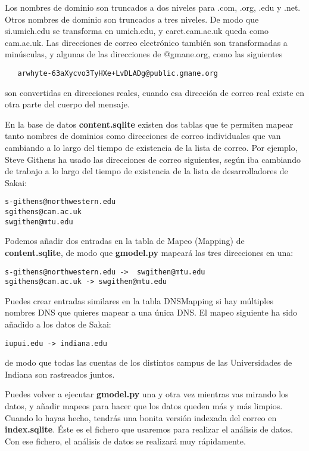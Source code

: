 Los nombres de dominio son truncados a dos niveles para .com, .org, .edu y .net.
Otros nombres de dominio son truncados a tres niveles. De modo que si.umich.edu se transforma en
umich.edu, y caret.cam.ac.uk queda como cam.ac.uk. Las direcciones de correo electrónico también
son transformadas a minúsculas, y algunas de las direcciones de @gmane.org, como las siguientes

\beforeverb
\begin{verbatim}
   arwhyte-63aXycvo3TyHXe+LvDLADg@public.gmane.org
\end{verbatim}
\afterverb
%
son convertidas en direcciones reales, cuando esa dirección de correo real existe
en otra parte del cuerpo del mensaje.

En la base de datos {\bf content.sqlite} existen dos tablas que te permiten
mapear tanto nombres de dominios como direcciones de correo individuales que van cambiando
a lo largo del tiempo de existencia de la lista de correo. Por ejemplo, Steve Githens ha usado las
direcciones de correo siguientes, según iba cambiando de trabajo a lo largo del tiempo de existencia
de la lista de desarrolladores de Sakai:

\beforeverb
\begin{verbatim}
s-githens@northwestern.edu
sgithens@cam.ac.uk
swgithen@mtu.edu
\end{verbatim}
\afterverb
%
Podemos añadir dos entradas en la tabla de Mapeo (Mapping) de {\bf content.sqlite}, de modo
que {\bf gmodel.py} mapeará las tres direcciones en una:

\beforeverb
\begin{verbatim}
s-githens@northwestern.edu ->  swgithen@mtu.edu
sgithens@cam.ac.uk -> swgithen@mtu.edu
\end{verbatim}
\afterverb
%
Puedes crear entradas similares en la tabla DNSMapping si hay múltiples nombres
DNS que quieres mapear a una única DNS. El mapeo siguiente ha sido añadido a los datos de Sakai:

\beforeverb
\begin{verbatim}
iupui.edu -> indiana.edu
\end{verbatim}
\afterverb
%
de modo que todas las cuentas de los distintos campus de las Universidades de Indiana son
rastreados juntos.

Puedes volver a ejecutar {\bf gmodel.py} una y otra vez mientras vas mirando los datos, y añadir
mapeos para hacer que los datos queden más y más limpios. Cuando lo hayas hecho, tendrás una bonita
versión indexada del correo en {\bf index.sqlite}. Éste es el fichero que usaremos para realizar
el análisis de datos. Con ese fichero, el análisis de datos se realizará muy rápidamente.

